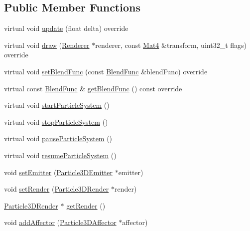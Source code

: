 \subsection*{Public Member Functions}
\begin{DoxyCompactItemize}
\item 
virtual void \hyperlink{classParticleSystem3D_a04fb4f09a517f393b5deb8174b964e40}{update} (float delta) override
\item 
virtual void \hyperlink{classParticleSystem3D_a78e6969723062a91ffbd46b08dd0fcb2}{draw} (\hyperlink{classRenderer}{Renderer} $\ast$renderer, const \hyperlink{classMat4}{Mat4} \&transform, uint32\+\_\+t flags) override
\item 
virtual void \hyperlink{classParticleSystem3D_a93c7e5313e8860628304814631edfb94}{set\+Blend\+Func} (const \hyperlink{structBlendFunc}{Blend\+Func} \&blend\+Func) override
\item 
virtual const \hyperlink{structBlendFunc}{Blend\+Func} \& \hyperlink{classParticleSystem3D_a20b5bdbd3a43ea851174fa6b680054ed}{get\+Blend\+Func} () const override
\item 
virtual void \hyperlink{classParticleSystem3D_aecd79152c049fc63e5ea464589765e5b}{start\+Particle\+System} ()
\item 
virtual void \hyperlink{classParticleSystem3D_a45c003e1eb2fc4d38ab74fd6231a7c47}{stop\+Particle\+System} ()
\item 
virtual void \hyperlink{classParticleSystem3D_ade8abd1ad8b534b6c8485aa43ed8c78e}{pause\+Particle\+System} ()
\item 
virtual void \hyperlink{classParticleSystem3D_ac5f7a2d3bd35d5243e2e90578b8daed3}{resume\+Particle\+System} ()
\item 
void \hyperlink{classParticleSystem3D_aeb2593035516362a6e8209efdc8af68e}{set\+Emitter} (\hyperlink{classParticle3DEmitter}{Particle3\+D\+Emitter} $\ast$emitter)
\item 
void \hyperlink{classParticleSystem3D_abeb1c12eab97f24cd02adeb6453d6f2a}{set\+Render} (\hyperlink{classParticle3DRender}{Particle3\+D\+Render} $\ast$render)
\item 
\hyperlink{classParticle3DRender}{Particle3\+D\+Render} $\ast$ \hyperlink{classParticleSystem3D_a7ca1509df2a6890b503dc54dfa08a2b4}{get\+Render} ()
\item 
void \hyperlink{classParticleSystem3D_ae724cd8008b8ef3206659c4fedbf7339}{add\+Affector} (\hyperlink{classParticle3DAffector}{Particle3\+D\+Affector} $\ast$affector)
\item 

\end{DoxyCompactItemize}
